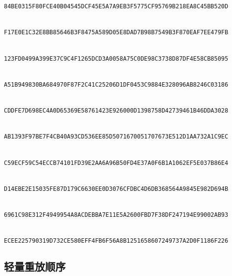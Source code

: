 \nolinkurl{84BE0315F80FCE40B04545DCF45E5A7A9EB3F5775CF95769B218EA8C45BB520D}\par
\smallskip
\noindent{}\\
\nolinkurl{F17E0E1C32E8BB85646B3F8475A589D05E8DAD7B98B7549B3F870EAF7EE479FB}\par
\smallskip
\noindent{}\\
\nolinkurl{123FD0499A399E37C9C4F1265DCD3A0058A75C0DE98C3738D87DF4E58CB85095}\par
\smallskip
\noindent{}\\
\nolinkurl{A51B949830BA684970F87F2C41C25206D1DF0453C9884E328096AB8246C03186}\par
\smallskip
\noindent{}\\
\nolinkurl{CDDFE7D698EC4A0D65369E58761423E926000D1398758D42739461B46DDA3028}\par
\smallskip
\noindent{}\\
\nolinkurl{AB1393F97BE7F4CB40A93CD536EE85D5071670051707673E512D1AA732A1C9EC}\par
\smallskip
\noindent{}\\
\nolinkurl{C59ECF59C54ECCB74101FD39E2AA6A96B50FD4E37A0F6B1A1062EF5E037B86E4}\par
\smallskip
\noindent{}\\
\nolinkurl{D14EBE2E15035FE87D179C6630EE0D3076CFDBC4D6DB368564A9845E982D694B}\par
\smallskip
\noindent{}\\
\nolinkurl{6961C98E312F4949954A8ACDEBBA7E11E5A2600FBD7F38DF247194E99002AB93}\par
\smallskip
\noindent{}\\
\nolinkurl{ECEE225790319D732CE580EFF4FB6F56A8B1251658607249737A2D0F1186F226}\par
\endgroup

\subsection{轻量重放顺序}\label{app:replay-order}

